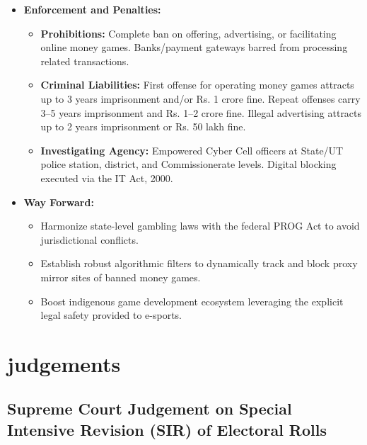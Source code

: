 \begin{itemize}
\begin{itemize}
    \end{itemize}
    \item \textbf{Enforcement and Penalties:}
    \begin{itemize}
        \item \textbf{Prohibitions:} Complete ban on offering, advertising, or facilitating online money games. Banks/payment gateways barred from processing related transactions.
        \item \textbf{Criminal Liabilities:} First offense for operating money games attracts up to 3 years imprisonment and/or Rs. 1 crore fine. Repeat offenses carry 3--5 years imprisonment and Rs. 1--2 crore fine. Illegal advertising attracts up to 2 years imprisonment or Rs. 50 lakh fine.
        \item \textbf{Investigating Agency:} Empowered Cyber Cell officers at State/UT police station, district, and Commissionerate levels. Digital blocking executed via the IT Act, 2000.
    \end{itemize}
    \item \textbf{Way Forward:}
    \begin{itemize}
        \item Harmonize state-level gambling laws with the federal PROG Act to avoid jurisdictional conflicts.
        \item Establish robust algorithmic filters to dynamically track and block proxy mirror sites of banned money games.
        \item Boost indigenous game development ecosystem leveraging the explicit legal safety provided to e-sports.
    \end{itemize}
\end{itemize}

\section{judgements}
\subsection{Supreme Court Judgement on Special Intensive Revision (SIR) of Electoral Rolls}

